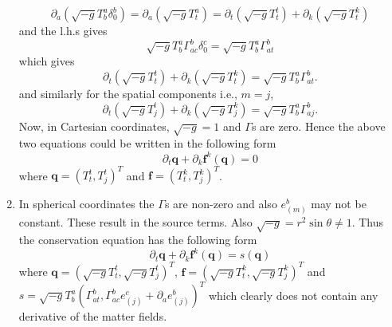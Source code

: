 \documentclass[10pt]{article}
\begin{document}
\begin{enumerate}
\begin{equation}
    \label{eq:t-comp-consv}
    \partial_a (\sqrt{-g}T^a_b \delta^{b}_0) = \partial_a (\sqrt{-g}T^a_t) = \partial_t (\sqrt{-g} T^t_t) + \partial_k (\sqrt{-g}T^k_t)
  \end{equation}
  and the l.h.s gives
  \begin{equation}
    \label{eq:1}
    \sqrt{-g}T^a_b \Gamma^b_{ac}\delta^c_0 = \sqrt{-g}T^a_b \Gamma^b_{at}
  \end{equation}
  which gives
  \begin{equation}
    \label{eq:m=0}
    \boxed{\partial_t (\sqrt{-g} T^t_t) + \partial_k (\sqrt{-g}T^k_t) = \sqrt{-g}T^a_b \Gamma^b_{at}}.
  \end{equation}
  and similarly for the spatial components i.e., $m=j$,
  \begin{equation}
    \label{eq:m=j}
    \boxed{\partial_t (\sqrt{-g} T^t_j) + \partial_k (\sqrt{-g}T^k_j) = \sqrt{-g}T^a_b \Gamma^b_{aj}}.
  \end{equation}
  Now, in Cartesian coordinates, $\sqrt{-g} = 1$ and  $\Gamma$s are zero. Hence the above two equations could be written in the following form
  \begin{equation}
    \label{eq:conservation-cartesian}
    \boxed{\partial_t\mathbf{q} + \partial_k \mathbf{f}^k(\mathbf{q}) = 0}
  \end{equation}
  where $\mathbf{q} = (T^t_t, T^t_j)^T$ and $\mathbf{f} = (T^k_t, T^k_j)^T$.
\item In spherical coordinates the $\Gamma$s are non-zero and also $e_{(m)}^b$ may not be constant. These result in the source terms. Also $\sqrt{-g} = r^2 \sin\theta \neq 1$. Thus the conservation equation has the following form
  \begin{equation}
    \label{eq:conservation-spherical}
    \boxed{\partial_t \mathbf{q} + \partial_k \mathbf{f}^k(\mathbf{q}) = s(\mathbf{q})}
  \end{equation}
  where $\mathbf{q} = (\sqrt{-g}T^t_t, \sqrt{-g}T^t_j)^T$, $\mathbf{f} = (\sqrt{-g}T^k_t, \sqrt{-g}T^k_j)^T$ and $s = \sqrt{-g}T^a_b(\Gamma^b_{at}, \Gamma^b_{a c}e^c_{(j)} + \partial_ae^b_{(j)})^T$ which clearly does not contain any derivative of the matter fields.
\end{enumerate}
\end{document}
